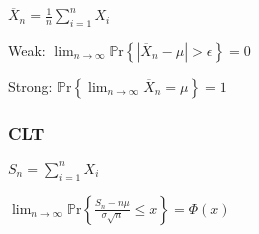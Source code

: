 \documentclass[9pt,landscape]{article}
\begin{document}
\begin{multicols}{3}
$\overline{X}_n=\frac{1}{n}\sum_{i=1}^{n}X_i$

Weak: $\lim_{n\to\infty}\mathbb{P}\mathrm{r}\left\{\left|\overline{X}_n-\mu\right|>\epsilon\right\}=0$

Strong: $\mathbb{P}\mathrm{r}\left\{\lim_{n\to\infty}\overline{X}_n=\mu\right\}=1$

\subsubsection{CLT}

$S_n=\sum_{i=1}^{n}X_i$

$\lim_{n\to\infty}\mathbb{P}\mathrm{r}\left\{\frac{S_n-n\mu}{\sigma\sqrt{n}}\le x\right\}=\Phi(x)$

\end{multicols}
\end{document}
